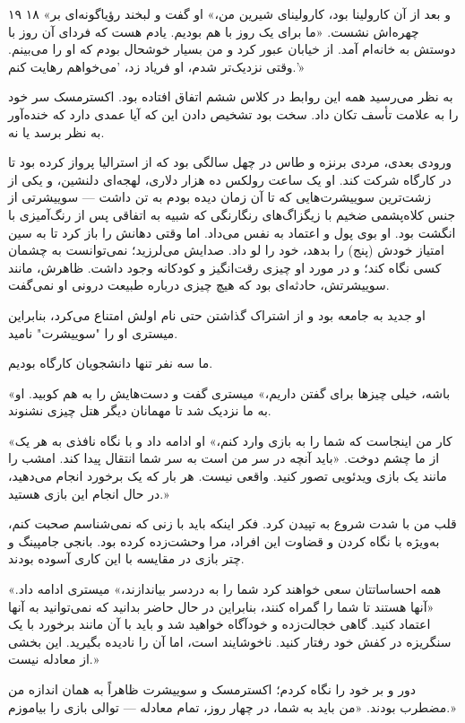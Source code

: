 ۱۹  
۱۸  
«و بعد از آن کارولینا بود، کارولینای شیرین من،» او گفت و لبخند رؤیاگونه‌ای بر چهره‌اش نشست. «ما برای یک روز با هم بودیم. یادم هست که فردای آن روز با دوستش به خانه‌ام آمد. از خیابان عبور کرد و من بسیار خوشحال بودم که او را می‌بینم. وقتی نزدیک‌تر شدم، او فریاد زد، 'می‌خواهم رهایت کنم.'»

به نظر می‌رسید همه این روابط در کلاس ششم اتفاق افتاده بود. اکسترمسک سر خود را به علامت تأسف تکان داد. سخت بود تشخیص دادن این که آیا عمدی دارد که خنده‌آور به نظر برسد یا نه.

ورودی بعدی، مردی برنزه و طاس در چهل سالگی بود که از استرالیا پرواز کرده بود تا در کارگاه شرکت کند. او یک ساعت رولکس ده هزار دلاری، لهجه‌ای دلنشین، و یکی از زشت‌ترین سوییشرت‌هایی که تا آن زمان دیده بودم به تن داشت — سوییشرتی از جنس کلاه‌پشمی ضخیم با زیگزاگ‌های رنگارنگی که شبیه به اتفاقی پس از رنگ‌آمیزی با انگشت بود. او بوی پول و اعتماد به نفس می‌داد. اما وقتی دهانش را باز کرد تا به سین امتیاز خودش (پنج) را بدهد، خود را لو داد. صدایش می‌لرزید؛ نمی‌توانست به چشمان کسی نگاه کند؛ و در مورد او چیزی رقت‌انگیز و کودکانه وجود داشت. ظاهرش، مانند سوییشرتش، حادثه‌ای بود که هیچ چیزی درباره طبیعت درونی او نمی‌گفت.

او جدید به جامعه بود و از اشتراک گذاشتن حتی نام اولش امتناع می‌کرد، بنابراین میستری او را "سوییشرت" نامید.

ما سه نفر تنها دانشجویان کارگاه بودیم.  

«باشه، خیلی چیزها برای گفتن داریم،» میستری گفت و دست‌هایش را به هم کوبید. او به ما نزدیک شد تا مهمانان دیگر هتل چیزی نشنوند.

«کار من اینجاست که شما را به بازی وارد کنم،» او ادامه داد و با نگاه نافذی به هر یک از ما چشم دوخت. «باید آنچه در سر من است به سر شما انتقال پیدا کند. امشب را مانند یک بازی ویدئویی تصور کنید. واقعی نیست. هر بار که یک برخورد انجام می‌دهید، در حال انجام این بازی هستید.»

قلب من با شدت شروع به تپیدن کرد. فکر اینکه باید با زنی که نمی‌شناسم صحبت کنم، به‌ویژه با نگاه کردن و قضاوت این افراد، مرا وحشت‌زده کرده بود. بانجی جامپینگ و چتر بازی در مقایسه با این کاری آسوده بودند.

«همه احساساتتان سعی خواهند کرد شما را به دردسر بیاندازند،» میستری ادامه داد. «آنها هستند تا شما را گمراه کنند، بنابراین در حال حاضر بدانید که نمی‌توانید به آنها اعتماد کنید. گاهی خجالت‌زده و خودآگاه خواهید شد و باید با آن مانند برخورد با یک سنگریزه در کفش خود رفتار کنید. ناخوشایند است، اما آن را نادیده بگیرید. این بخشی از معادله نیست.»

دور و بر خود را نگاه کردم؛ اکسترمسک و سوییشرت ظاهراً به همان اندازه من مضطرب بودند. «من باید به شما، در چهار روز، تمام معادله — توالی بازی را بیاموزم.»